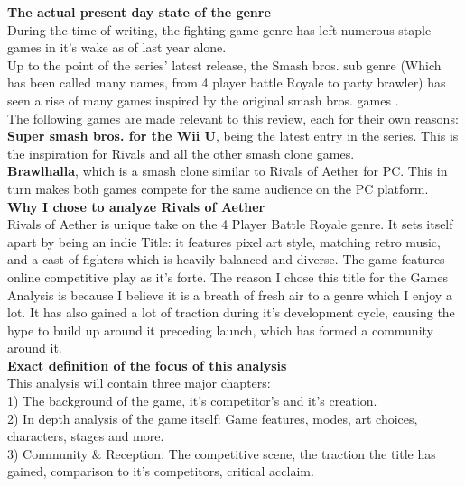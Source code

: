 \documentclass{article}
\begin{document}
\textbf{The actual present day state of the genre}\\
During the time of writing, the fighting game genre has left numerous staple games in it's wake as of last year alone.\cite{eltonjones2017:8}\\
Up to the point of the series' latest release, the Smash bros. sub genre (Which has been called many names, from 4 player battle Royale to party brawler) has seen a rise of many games inspired by the original smash bros. games \cite{lucassullivan2014:9}.\\
The following games are made relevant to this review, each for their own reasons:\\
\textbf{Super smash bros. for the Wii U}, being the latest entry in the series. This is the inspiration for Rivals and all the other smash clone games.\\
\textbf{Brawlhalla}, which is a smash clone similar to Rivals of Aether for PC. This in turn makes both games compete for the same audience on the PC platform.\\
\textbf{Why I chose to analyze Rivals of Aether}\\
Rivals of Aether is unique take on the 4 Player Battle Royale genre. It sets itself apart by being an indie Title: it features pixel art style, matching retro music, and a cast of fighters which is heavily balanced and diverse. The game features online competitive play as it's forte. The reason I chose this title for the Games Analysis is because I believe it is a breath of fresh air to a genre which I enjoy a lot. It has also gained a lot of traction during it's development cycle, causing the hype to build up around it preceding launch, which has formed a community around it.\\

\textbf{Exact definition of the focus of this analysis}\\
This analysis will contain three major chapters:\\
1) The background of the game, it's competitor's and it's creation.\\
2) In depth analysis of the game itself: Game features, modes, art choices, characters, stages and more.\\
3) Community & Reception: The competitive scene, the traction the title has gained, comparison to it's competitors, critical acclaim.\\
\end{document}
